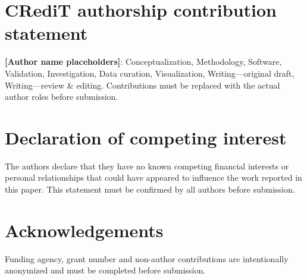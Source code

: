 \documentclass[preprint,12pt]{elsarticle}
\begin{document}
\section*{CRediT authorship contribution statement}
\textbf{[Author name placeholders]}: Conceptualization, Methodology, Software, Validation, Investigation, Data curation, Visualization, Writing---original draft, Writing---review \& editing. Contributions must be replaced with the actual author roles before submission.

\section*{Declaration of competing interest}
The authors declare that they have no known competing financial interests or personal relationships that could have appeared to influence the work reported in this paper. This statement must be confirmed by all authors before submission.

\section*{Acknowledgements}
Funding agency, grant number and non-author contributions are intentionally anonymized and must be completed before submission.



\end{document}
